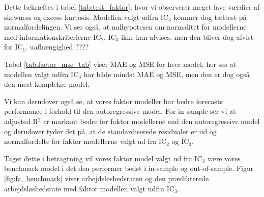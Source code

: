 Dette bekræftes i tabel \ref{tab:test_faktor}, hvor vi observerer meget lave værdier af skewness og excess kurtosis. 
Modellen valgt udfra IC$_3$ kommer dog tættest på normalfordelingen.
Vi ser også, at nulhypotesen om normalitet for modellerne med informationskriterierne IC$_2$, IC$_3$ ikke kan afvises, men den bliver dog afvist for IC$_1$. uafhængighed ????
 
Tabel \ref{tab:factor_mse_tab} viser MAE og MSE for hver model, her ses at modellen valgt udfra IC$_3$ har både mindst MAE og MSE, men den er dog også den mest komplekse model. 



Vi kan derudover også se, at vores faktor modeller har bedre forecasts performance i forhold til den autoregressive model. 
For in-sample ser vi at adjusted R$^2$ er markant bedre for faktor modellerne end den autoregressive model og derudover tyder det på, at de standardiserede residualer er iid og normalfordelte for faktor modellerne valgt ud fra IC$_2$ og IC$_3$. 

Taget dette i betragtning vil vores faktor model valgt ud fra IC$_3$ være vores benchmark model i det den performer bedst i in-sample og out-of-sample. 
Figur \ref{fig:fc_benchmark} viser arbejdsløshedsraten og den prædikterede arbejdsløshedsrate med faktor modellen valgt udfra IC\(_3\).




%
%
%
%






